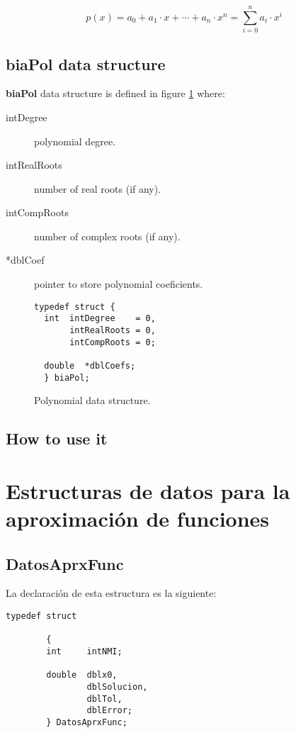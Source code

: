 \begin{equation}
p(x) = a_0 + a_1 \cdot x + \cdots + a_n \cdot x^n = \sum_{i=0}^n a_i \cdot x^i
\end{equation}

\subsection{biaPol data structure} \label{sec:biaPol}

\textbf{biaPol} data structure is defined in figure \ref{fig:biaPol} where:

\begin{description}
\item[intDegree] polynomial degree.
\item[intRealRoots] number of real roots (if any).
\item[intCompRoots] number of complex roots (if any).
\item[*dblCoef] pointer to store polynomial coeficients.
\end{description}

\begin{figure}[!h]
\begin{verbatim}
typedef struct {
  int  intDegree    = 0,
       intRealRoots = 0,
       intCompRoots = 0;

  double  *dblCoefs;
  } biaPol;
\end{verbatim}
\caption{Polynomial data structure.} \label{fig:biaPol}
\end{figure}

\subsection{How to use it}


\section{Estructuras de datos para la aproximaci\'on de funciones}

\subsection{DatosAprxFunc} \label{sec:DatosAprxFunc}

La declaraci\'on de esta estructura es la siguiente:

\begin{verbatim}
typedef struct

        {
        int     intNMI;

        double  dblx0,
                dblSolucion,
                dblTol,
                dblError; 
        } DatosAprxFunc;
\end{verbatim}

